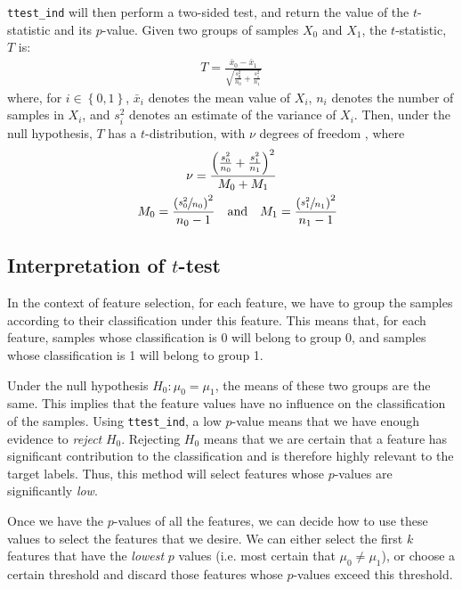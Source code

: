 \documentclass[12pt, twoside, a4paper]{report}
\begin{document}
\texttt{ttest\_ind} will then perform a two-sided test, and return the value of the $t$-statistic and its $p$-value. Given two groups of samples $X_0$ and $X_1$, the $t$-statistic, $T$ is:
\begin{align*}
T = \frac{\bar{x}_0 - \bar{x}_1}{\sqrt{\frac{s_0^2}{n_0} + \frac{s_1^2}{n_1}}}
\end{align*}
where, for $i \in \left\lbrace 0,1 \right\rbrace$, $\bar{x}_i$ denotes the mean value of $X_i$, $n_i$ denotes the number of samples in $X_i$, and $s_i^2$ denotes an estimate of the variance of $X_i$. Then, under the null hypothesis, $T$ has a $t$-distribution, with $\nu$ degrees of freedom \cite{RefWorks:219}, where
\begin{gather*}
\nu = \frac{\left( \frac{s_0^2}{n_0} + \frac{s_1^2}{n_1} \right)^2}{ M_0 + M_1 } \\
\quad M_0 = \frac{\left(\sfrac{s_0^2}{n_0}\right)^2}{n_0-1} \quad \text{and} \quad
M_1 = \frac{\left(\sfrac{s_1^2}{n_1}\right)^2}{n_1-1}
\end{gather*}

\subsection{Interpretation of $t$-test}
In the context of feature selection, for each feature, we have to group the samples according to their classification under this feature. This means that, for each feature, samples whose classification is 0 will belong to group 0, and samples whose classification is 1 will belong to group 1.

Under the null hypothesis $H_0: \mu_0 = \mu_1$, the means of these two groups are the same. This implies that the feature values have no influence on the classification of the samples. Using \texttt{ttest\_ind}, a low $p$-value means that we have enough evidence to \textit{reject} $H_0$. Rejecting $H_0$ means that we are certain that a feature has significant contribution to the classification and is therefore highly relevant to the target labels. Thus, this method will select features whose $p$-values are significantly \textit{low}.

Once we have the $p$-values of all the features, we can decide how to use these values to select the features that we desire. We can either select the first $k$ features that have the \textit{lowest} $p$ values (i.e. most certain that $\mu_0 \neq \mu_1$), or choose a certain threshold and discard those features whose $p$-values exceed this threshold.
\end{document}
